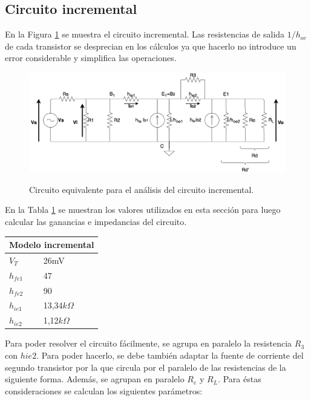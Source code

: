 	\subsection{Circuito incremental}
	
	En la Figura \ref{circ_incremental} se muestra el circuito incremental. Las resistencias de salida $1/h_{oe}$ de cada transistor se desprecian en los cálculos ya que hacerlo no introduce un error considerable y simplifica las operaciones.
		\begin{figure}[H]
			\centering
			\includegraphics[scale=0.4]{./Imagenes/circ_incremental.png} \\
			\caption{Circuito equivalente para el an\'alisis del circuito incremental.}
			\label{circ_incremental}
		\end{figure}

En la Tabla \ref{tabla_valores_incremental} se muestran los valores utilizados en esta sección para luego calcular las ganancias e impedancias del circuito.

\begin{table}[H]
\centering
\begin{tabular}{ll}
\multicolumn{2}{l}{Modelo incremental} \\ \hline
$V_T$              & 26mV             \\
$h_{fe1}$           & 47            \\
$h_{fe2}$           & 90            \\
$h_{ie1}$            & 13,34$k\Omega$            \\
$h_{ie2}$           & 1,12$k\Omega$             \\
\end{tabular}
\label{tabla_valores_incremental} 
\end{table}

Para poder resolver el circuito fácilmente, se agrupa en paralelo la resistencia $R_3$ con $hie2$. Para poder hacerlo, se debe también adaptar la fuente de corriente del segundo transistor por la que circula por el paralelo de las resistencias de la siguiente forma. Además, se agrupan en paralelo $R_e$ y $R_L$. Para éstas consideraciones se calculan los siguientes parámetros:

